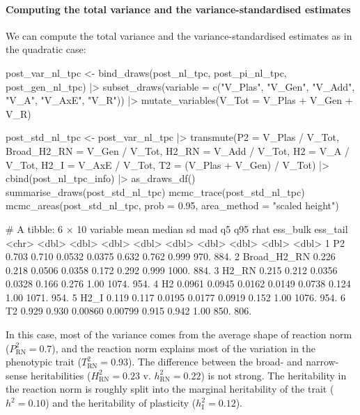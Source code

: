 \documentclass[a4paper,12pt,twoside]{article}
\begin{document}
\paragraph{Computing the total variance and the variance-standardised estimates}
We can compute the total variance and the variance-standardised estimates as in the quadratic case:
\begin{Rinput}
post_var_nl_tpc <-
    bind_draws(post_nl_tpc, post_pi_nl_tpc, post_gen_nl_tpc) |>
    subset_draws(variable = c("V_Plas", "V_Gen", "V_Add", "V_A", "V_AxE", "V_R")) |>
    mutate_variables(V_Tot = V_Plas + V_Gen + V_R)

post_std_nl_tpc <-
    post_var_nl_tpc |>
    transmute(P2            = V_Plas / V_Tot,
              Broad_H2_RN   = V_Gen / V_Tot,
              H2_RN         = V_Add / V_Tot,
              H2            = V_A / V_Tot,
              H2_I          = V_AxE / V_Tot,
              T2            = (V_Plas + V_Gen) / V_Tot) |>
    cbind(post_nl_tpc_info) |>
    as_draws_df()
summarise_draws(post_std_nl_tpc)
mcmc_trace(post_std_nl_tpc)
mcmc_areas(post_std_nl_tpc,
           prob = 0.95,
           area_method = "scaled height")
\end{Rinput}
\begin{Routput}
# A tibble: 6 × 10
  variable      mean median      sd     mad     q5   q95  rhat ess_bulk ess_tail
  <chr>        <dbl>  <dbl>   <dbl>   <dbl>  <dbl> <dbl> <dbl>    <dbl>    <dbl>
1 P2          0.703  0.710  0.0532  0.0375  0.632  0.762 0.999     970.     884.
2 Broad_H2_RN 0.226  0.218  0.0506  0.0358  0.172  0.292 0.999    1000.     884.
3 H2_RN       0.215  0.212  0.0356  0.0328  0.166  0.276 1.00     1074.     954.
4 H2          0.0961 0.0945 0.0162  0.0149  0.0738 0.124 1.00     1071.     954.
5 H2_I        0.119  0.117  0.0195  0.0177  0.0919 0.152 1.00     1076.     954.
6 T2          0.929  0.930  0.00860 0.00799 0.915  0.942 1.00      850.     806.
\end{Routput}
In this case, most of the variance comes from the average shape of reaction norm ($P^{2}_{\text{RN}}=0.7$), and the reaction norm explains most of the variation in the phenotypic trait ($T^{2}_{\text{RN}}=0.93$). The difference between the broad- and narrow-sense heritabilities ($H^{2}_{\text{RN}}=0.23$ v. $h^{2}_{\text{RN}}=0.22$) is not strong. The heritability in the reaction norm is roughly split into the marginal heritability of the trait ($h^{2}=0.10$) and the heritability of plasticity ($h^{2}_{\text{I}}=0.12$).
%
\end{document}

